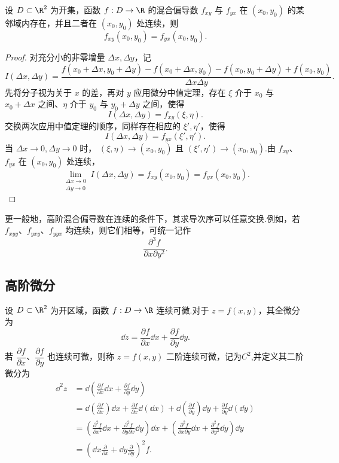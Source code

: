 \begin{theorem}
	设 $D\subset\R^2$ 为开集，函数 $f:D\to\R$ 的混合偏导数
	$f_{xy}$ 与 $f_{yx}$ 在 $(x_0,y_0)$ 的某邻域内存在，并且二者在
	$(x_0,y_0)$ 处连续，则
	\[
	f_{xy}(x_0,y_0)=f_{yx}(x_0,y_0).
	\]
\end{theorem}

\begin{proof}
	对充分小的非零增量 $\Delta x,\Delta y$，记
	\[
	I(\Delta x,\Delta y)
	=
	\frac{
	f(x_0+\Delta x,y_0+\Delta y)-f(x_0+\Delta x,y_0)
	-f(x_0,y_0+\Delta y)+f(x_0,y_0)}
	{\Delta x\Delta y}.
	\]
	先将分子视为关于 $x$ 的差，再对 $y$ 应用微分中值定理，存在
	$\xi$ 介于 $x_0$ 与 $x_0+\Delta x$ 之间、$\eta$ 介于
	$y_0$ 与 $y_0+\Delta y$ 之间，使得
	\[
	I(\Delta x,\Delta y)=f_{xy}(\xi,\eta).
	\]
	交换两次应用中值定理的顺序，同样存在相应的
	$\xi',\eta'$，使得
	\[
	I(\Delta x,\Delta y)=f_{yx}(\xi',\eta').
	\]
	当 $\Delta x\to0,\Delta y\to0$ 时，
	$(\xi,\eta)\to(x_0,y_0)$ 且
	$(\xi',\eta')\to(x_0,y_0)$.由 $f_{xy}$、$f_{yx}$
	在 $(x_0,y_0)$ 处连续，
	\[
	\lim_{\substack{\Delta x\to0\\\Delta y\to0}}
	I(\Delta x,\Delta y)
	=f_{xy}(x_0,y_0)
	=f_{yx}(x_0,y_0).
	\]
\end{proof}

更一般地，高阶混合偏导数在连续的条件下，其求导次序可以任意交换.例如，若
$f_{xyy}$、$f_{yxy}$、$f_{yyx}$ 均连续，则它们相等，可统一记作
\[
\frac{\partial^3f}{\partial x\partial y^2}.
\]

\subsection*{高阶微分}

设 $D\subset\R^2$ 为开区域，函数 $f:D\to\R$ 连续可微.对于
$z=f(x,y)$，其全微分为
\[
\dd z=\frac{\partial f}{\partial x}\dd x
+\frac{\partial f}{\partial y}\dd y.
\]
若 $\dfrac{\partial f}{\partial x}$、$\dfrac{\partial f}{\partial y}$
也连续可微，则称 $z=f(x,y)$ 二阶连续可微，记为$C^2$,并定义其二阶微分为
\[
\begin{aligned}
\dd^2z
&=\dd\left(
\frac{\partial f}{\partial x}\dd x
+\frac{\partial f}{\partial y}\dd y
\right)\\
&=\dd\left(\frac{\partial f}{\partial x}\right)\dd x
+\frac{\partial f}{\partial x}\dd(\dd x)
+\dd\left(\frac{\partial f}{\partial y}\right)\dd y
+\frac{\partial f}{\partial y}\dd(\dd y)\\
&=
\left(
\frac{\partial^2f}{\partial x^2}\dd x
+\frac{\partial^2f}{\partial y\partial x}\dd y
\right)\dd x
+
\left(
\frac{\partial^2f}{\partial x\partial y}\dd x
+\frac{\partial^2f}{\partial y^2}\dd y
\right)\dd y\\
&=
\left(
\dd x\frac{\partial}{\partial x}
+\dd y\frac{\partial}{\partial y}
\right)^2f.
\end{aligned}
\]

